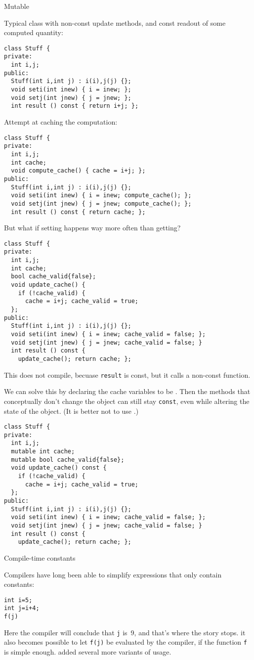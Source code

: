  {Mutable}

Typical class with non-const update methods,
and const readout of some computed quantity:
\begin{lstlisting}
class Stuff {
private:
  int i,j;
public:
  Stuff(int i,int j) : i(i),j(j) {};
  void seti(int inew) { i = inew; };
  void setj(int jnew) { j = jnew; };
  int result () const { return i+j; };
\end{lstlisting}
Attempt at caching the computation:
\begin{lstlisting}
class Stuff {
private:
  int i,j;
  int cache;
  void compute_cache() { cache = i+j; };
public:
  Stuff(int i,int j) : i(i),j(j) {};
  void seti(int inew) { i = inew; compute_cache(); };
  void setj(int jnew) { j = jnew; compute_cache(); };
  int result () const { return cache; };
\end{lstlisting}
But what if setting happens way more often than getting?
\begin{lstlisting}
class Stuff {
private:
  int i,j;
  int cache;
  bool cache_valid{false};
  void update_cache() {
    if (!cache_valid) {
      cache = i+j; cache_valid = true;
  };
public:
  Stuff(int i,int j) : i(i),j(j) {};
  void seti(int inew) { i = inew; cache_valid = false; };
  void setj(int jnew) { j = jnew; cache_valid = false; }
  int result () const {
    update_cache(); return cache; };
\end{lstlisting}
This does not compile, becuase \lstinline{result} is const, but it
calls a non-const function.

We can solve this by
declaring the cache variables to be .
Then the methods that conceptually don't change the object
can still stay \lstinline{const}, even while altering the state of the
object.
%
(It is better not to use .)

\begin{lstlisting}
class Stuff {
private:
  int i,j;
  mutable int cache;
  mutable bool cache_valid{false};
  void update_cache() const {
    if (!cache_valid) {
      cache = i+j; cache_valid = true;
  };
public:
  Stuff(int i,int j) : i(i),j(j) {};
  void seti(int inew) { i = inew; cache_valid = false; };
  void setj(int jnew) { j = jnew; cache_valid = false; }
  int result () const {
    update_cache(); return cache; };
\end{lstlisting}

 {Compile-time constants}

Compilers have long been able to simplify expressions that only
contain constants:
\begin{lstlisting}
int i=5;
int j=i+4;
f(j)
\end{lstlisting}
Here the compiler will conclude that \lstinline{j} is~9, and that's
where the story stops. it also
becomes possible to let \lstinline{f(j)} be evaluated by the compiler,
if the function \lstinline{f} is simple enough.
 added several more variants of
 usage.


